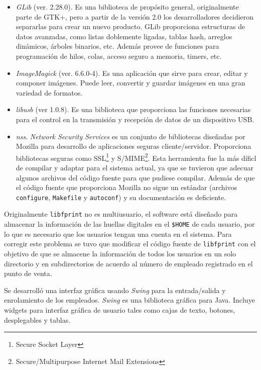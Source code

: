 \begin{itemize}
 \item \textit{GLib} (ver. 2.28.0). Es una biblioteca de propósito general, originalmente parte de GTK+, pero a partir de la versión 2.0 los desarrolladores decidieron separarlas para crear un nuevo producto. GLib proporciona estructuras de datos avanzadas, como listas doblemente ligadas, tablas hash, arreglos dinámicos, árboles binarios, etc. Además provee de funciones para programación de hilos, colas, acceso seguro a memoria, timers, etc.
 \item \textit{ImageMagick} (ver. 6.6.0-4). Es una aplicación que sirve para crear, editar y componer imágenes. Puede leer, convertir y guardar imágenes en una gran variedad de formatos.
 \item \textit{libusb} (ver 1.0.8). Es una biblioteca que proporciona las funciones necesarias para el control en la transmisión y recepción de datos de un dispositivo USB.
 \item \textit{nss}. \textit{Network Security Services} es un conjunto de bibliotecas diseñadas por Mozilla para desarrollo de aplicaciones seguras cliente/servidor. Proporciona bibliotecas seguras como SSL\footnote{Secure Socket Layer} y S/MIME\footnote{Secure/Multipurpose Internet Mail Extensions}. Esta herramienta fue la más díficl de compilar y adaptar para el sistema actual, ya que se tuvieron que adecuar algunos archivos del código fuente para que pudiese compilar. Además de que el código fuente que proporciona Mozilla no sigue un estándar (archivos \texttt{configure}, \texttt{Makefile} y \texttt{autoconf}) y su documentación es deficiente.
\end{itemize} 

Originalmente \texttt{libfprint} no es multiusuario, el software está diseñado para almacenar la información de las huellas digitales en el \texttt{\$HOME} de cada usuario, por lo que es necesario que los usuarios tengan una cuenta en el sistema. Para corregir este problema se tuvo que modificar el código fuente de \texttt{libfprint} con el objetivo de que se almacene la información de todos los usuarios en un solo directorio y en subdirectorios de acuerdo al número de empleado registrado en el punto de venta.

Se desarrolló una interfaz gráfica usando \textit{Swing} para la entrada/salida y enrolamiento de los empleados. \textit{Swing} es una biblioteca gráfica para Java. Incluye widgets para interfaz gráfica de usuario tales como cajas de texto, botones, desplegables y tablas.

